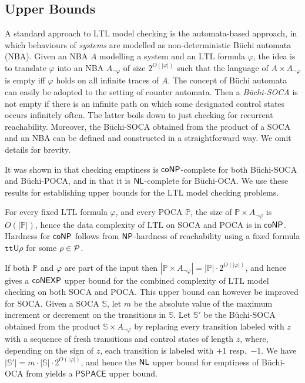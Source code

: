 \documentclass[times,envcountsame]{llncs}
\def\PSPACE{{\mathsf{PSPACE}}}
\def\U{{\mathsf{U}}}
\newcommand{\automaton}{\ensuremath{A}}
\newcommand{\Poca}{\mathbb{P}}
\newcommand{\Soca}{\mathbb{S}}
\newcommand{\ltl}{\text{LTL}}
\newcommand{\until}{\ensuremath{\U}}
\newcommand{\true}{\ensuremath{\mathtt{tt}}}
\begin{document}
\subsection{Upper Bounds}

A standard approach to $\ltl$ model checking is the automata-based
approach, in which behaviours of \emph{systems} are modelled as
non-deterministic B\"uchi automata (NBA). Given an NBA $\automaton$
modelling a system and an $\ltl$ formula $\varphi$, the idea is to
translate $\varphi$ into an NBA $\automaton_{\neg \varphi}$ of size
$2^{O(|\varphi|)}$ such that the language of $\automaton\times
\automaton_{\neg \varphi}$ is empty iff $\varphi$ holds on all
infinite traces of $\automaton$. The concept of B\"uchi automata can
easily be adopted to the setting of counter automata. Then a
\emph{B\"uchi-SOCA} is not empty if there is an infinite path on which
some designated control states occurs infinitely often. The latter
boils down to just checking for recurrent reachability. Moreover, the
B\"uchi-SOCA obtained from the product of a SOCA and an NBA can be
defined and constructed in a straightforward way. We omit details for brevity.

It was shown in \cite{HKOW10} that checking emptiness is
${\mathsf{coNP}}$-complete for both B\"uchi-SOCA and B\"uchi-POCA, and in
\cite{DG-jlc09} that it is ${\mathsf{NL}}$-complete for B\"uchi-OCA. We use
these results for establishing upper bounds for the $\ltl$ model
checking problems.

For every fixed $\ltl$ formula $\varphi$, and every POCA $\Poca$, the
size of $\Poca\times \automaton_{\neg \varphi}$ is $O(|\Poca|)$, hence
the data complexity of $\ltl$ on SOCA and POCA is in ${\mathsf{coNP}}$. Hardness
for ${\mathsf{coNP}}$ follows from ${\mathsf{NP}}$-hardness of reachability using a fixed
formula $\true \until \rho$ for some $\rho\in \mathcal{P}$.

If both $\Poca$ and $\varphi$ are part of the input then $|\Poca\times
\automaton_{\neg \varphi}|=|\Poca|\cdot 2^{O(|\varphi|)}$, and hence
\cite{HKOW10} gives a ${\mathsf{coNEXP}}$ upper bound for the combined
complexity of $\ltl$ model checking on both SOCA and POCA. This upper
bound can however be improved for SOCA. Given a SOCA $\Soca$, let $m$
be the absolute value of the maximum increment or decrement on the
transitions in $\Soca$.  Let $\Soca'$ be the B\"uchi-SOCA obtained
from the product $\Soca\times\automaton_{\neg \varphi}$ by replacing
every transition labeled with $z$ with a sequence of fresh transitions
and control states of length $z$, where, depending on the sign of
$z$, each transition is labeled with $+1$ resp.\ $-1$. We have
$|\Soca'|= m\cdot|\Soca|\cdot 2^{O(|\varphi|)}$, and hence the ${\mathsf{NL}}$
upper bound for emptiness of B\"uchi-OCA from \cite{DG-jlc09} yields a
$\PSPACE$ upper bound.
\end{document}
